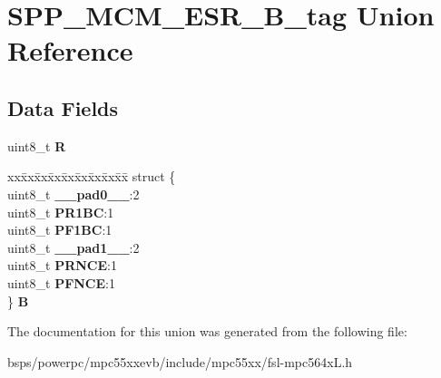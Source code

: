 \hypertarget{unionSPP__MCM__ESR__8B__tag}{}\section{S\+P\+P\+\_\+\+M\+C\+M\+\_\+\+E\+S\+R\+\_\+B\+\_\+tag Union Reference}
\label{unionSPP__MCM__ESR__8B__tag}
\subsection*{Data Fields}
\begin{DoxyCompactItemize}
\item 
\mbox{\label{unionSPP__MCM__ESR__8B__tag_aa81c6bd9d82a41fbb58d8c65150a7443}} 
uint8\+\_\+t {\bfseries R}
\item 
\mbox{\label{unionSPP__MCM__ESR__8B__tag_ab1cc9274a61e87ee9b6357d89d397c47}} 
\begin{tabbing}
xx\=xx\=xx\=xx\=xx\=xx\=xx\=xx\=xx\=\kill
struct \{\\
\>uint8\_t {\bfseries \_\_pad0\_\_}:2\\
\>uint8\_t {\bfseries PR1BC}:1\\
\>uint8\_t {\bfseries PF1BC}:1\\
\>uint8\_t {\bfseries \_\_pad1\_\_}:2\\
\>uint8\_t {\bfseries PRNCE}:1\\
\>uint8\_t {\bfseries PFNCE}:1\\
\} {\bfseries B}\\

\end{tabbing}\end{DoxyCompactItemize}


The documentation for this union was generated from the following file\+:\begin{DoxyCompactItemize}
\item 
bsps/powerpc/mpc55xxevb/include/mpc55xx/fsl-\/mpc564x\+L.\+h\end{DoxyCompactItemize}
